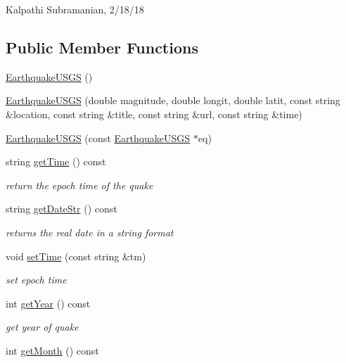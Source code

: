 Kalpathi Subramanian, 2/18/18 \subsection*{Public Member Functions}
\begin{DoxyCompactItemize}
\item 
\hyperlink{classbridges_1_1dataset_1_1_earthquake_u_s_g_s_a2e89f6ef9b631c6b8315c696cee7fb53}{Earthquake\+U\+S\+GS} ()
\item 
\hyperlink{classbridges_1_1dataset_1_1_earthquake_u_s_g_s_a3bb03ca9f4c0a3c8ecbab5a90b1886f8}{Earthquake\+U\+S\+GS} (double magnitude, double longit, double latit, const string \&location, const string \&title, const string \&url, const string \&time)
\item 
\hyperlink{classbridges_1_1dataset_1_1_earthquake_u_s_g_s_a382c751b8c71963ebcd7f0c7f1aed30a}{Earthquake\+U\+S\+GS} (const \hyperlink{classbridges_1_1dataset_1_1_earthquake_u_s_g_s}{Earthquake\+U\+S\+GS} $\ast$eq)
\item 
string \hyperlink{classbridges_1_1dataset_1_1_earthquake_u_s_g_s_a9078bfa4e954f78a3cf6e4a87747272b}{get\+Time} () const
\begin{DoxyCompactList}\small\item\em return the epoch time of the quake \end{DoxyCompactList}\item 
string \hyperlink{classbridges_1_1dataset_1_1_earthquake_u_s_g_s_a6fb0ff9a4f6cee9b1c04b588fc25c3ba}{get\+Date\+Str} () const
\begin{DoxyCompactList}\small\item\em returns the real date in a string format \end{DoxyCompactList}\item 
void \hyperlink{classbridges_1_1dataset_1_1_earthquake_u_s_g_s_af191301bcbaa5278480a57e9aea674d7}{set\+Time} (const string \&tm)
\begin{DoxyCompactList}\small\item\em set epoch time \end{DoxyCompactList}\item 
int \hyperlink{classbridges_1_1dataset_1_1_earthquake_u_s_g_s_a569120c9051d8d2fd73e3c778a81b9f3}{get\+Year} () const
\begin{DoxyCompactList}\small\item\em get year of quake \end{DoxyCompactList}\item 
int \hyperlink{classbridges_1_1dataset_1_1_earthquake_u_s_g_s_a010247e7474cc2434fff823a1a8b1142}{get\+Month} () const

\end{DoxyCompactItemize}

